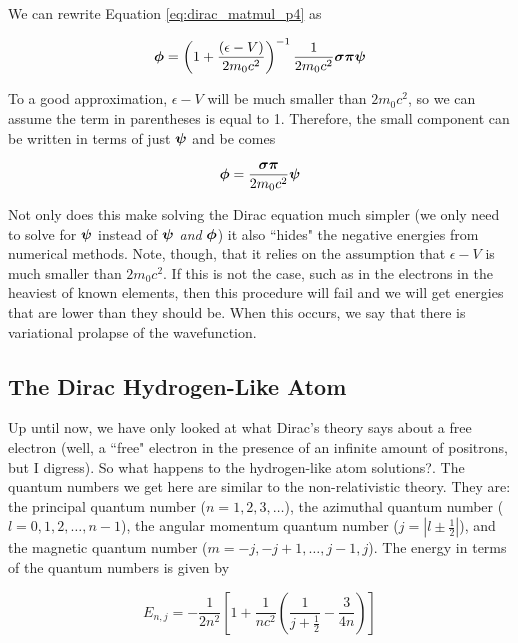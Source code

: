 We can rewrite Equation \ref{eq:dirac_matmul_p4} as

\begin{equation}
\label{eq:dirac_small_comp}
{\bf{\phi}} = \left(1 + \frac{(\epsilon - V)}{2m_{0}c^{2}}\right)^{-1}\frac{1}{2m_{0}c^{2}}{\bf{\sigma\pi}}{\bf{\psi}}
\end{equation}

To a good approximation, $\epsilon - V$ will be much smaller than $2m_{0}c^{2}$, so we can assume the term in parentheses is equal to 1. Therefore, the small component can be written in terms of just ${\bf{\psi}}$ and be comes

\begin{equation}
\label{eq:dirac_small_comp_simp}
{\bf{\phi}} = \frac{{\bf{\sigma\pi}}}{2m_{0}c^{2}}{\bf{\psi}}
\end{equation}

Not only does this make solving the Dirac equation much simpler (we only need to solve for ${\bf{\psi}}$ instead of ${\bf{\psi}}$ \textit{and} ${\bf{\phi}}$) it also ``hides" the negative energies from numerical methods. Note, though, that it relies on the assumption that $\epsilon - V$ is much smaller than $2m_{0}c^{2}$. If this is not the case, such as in the electrons in the heaviest of known elements, then this procedure will fail and we will get energies that are lower than they should be. When this occurs, we say that there is variational prolapse of the wavefunction.

\subsection{The Dirac Hydrogen-Like Atom}
Up until now, we have only looked at what Dirac's theory says about a free electron (well, a ``free" electron in the presence of an infinite amount of positrons, but I digress). So what happens to the hydrogen-like atom solutions?. The quantum numbers we get here are similar to the non-relativistic theory. They are: the principal quantum number ($n=1,2,3,\ldots$), the azimuthal quantum number ($l = 0, 1, 2, \ldots, n-1$), the angular momentum quantum number ($j = | l \pm \frac{1}{2}|$), and the magnetic quantum number ($m = -j,-j+1, \ldots, j-1, j$). The energy in terms of the quantum numbers is given by\cite{Piela}

\begin{equation}
\label{eq:dirac_energy}
E_{n, j} = -\frac{1}{2n^{2}}\left[1+\frac{1}{nc^{2}}\left(\frac{1}{j+\frac{1}{2}}-\frac{3}{4n}\right)\right]
\end{equation}

